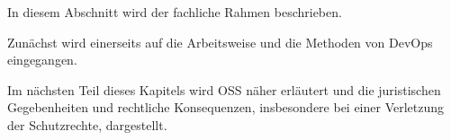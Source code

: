 In diesem Abschnitt wird der fachliche Rahmen beschrieben. 

Zunächst wird einerseits auf die Arbeitsweise und die Methoden von DevOps eingegangen. 

Im nächsten Teil dieses Kapitels wird OSS näher erläutert und die juristischen Gegebenheiten und rechtliche Konsequenzen, insbesondere bei einer Verletzung der Schutzrechte, dargestellt. 

